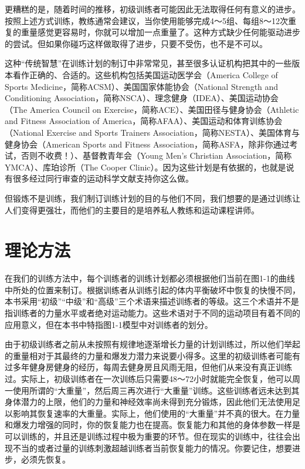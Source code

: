 更糟糕的是，随着时间的推移，初级训练者可能因此无法取得任何有意义的进步。按照上述方式训练，教练通常会建议，当你使用能够完成4～5组、每组8～12次重复的重量感觉更容易时，你就可以增加一点重量了。这种方式缺少任何能驱动进步的尝试。但如果你碰巧这样做取得了进步，只要不受伤，也不是不可以。

这种“传统智慧”在训练计划的制订中非常常见，甚至很多认证机构把其中的一些版本看作正确的、合适的。这些机构包括美国运动医学会（America College of Sports Medicine，简称ACSM）、美国国家体能协会（National Strength and Conditioning Association，简称NSCA）、理念健身（IDEA）、美国运动协会（The America Council on Exercise，简称ACE）、美国田径与健身协会（Athletic and Fitness Association of America，简称AFAA）、美国运动和体育训练协会（National Exercise and Sports Trainers Association，简称NESTA）、美国体育与健身协会（American Sports and Fitness Association，简称ASFA，除非你通过考试，否则不收费！）、基督教青年会（Young Men's Christian Association，简称YMCA）、库珀诊所（The Cooper Clinic）。因为这些计划是有依据的，也就是说有很多经过同行审查的运动科学文献支持你这么做。

但锻炼不是训练，我们制订训练计划的目的与他们不同，我们想要的是通过训练让人们变得更强壮，而他们的主要目的是培养私人教练和运动课程讲师。

\section{理论方法}

在我们的训练方法中，每个训练者的训练计划都必须根据他们当前在图1-1的曲线中所处的位置来制订。根据训练者从训练引起的体内平衡破坏中恢复的快慢不同，本书采用“初级”“中级”和“高级”三个术语来描述训练者的等级。这三个术语并不是指训练者的力量水平或者绝对运动能力。这些术语对于不同的运动项目有着不同的应用意义，但在本书中特指图1-1模型中对训练者的划分。

由于初级训练者之前从未按照有规律地逐渐增长力量的计划训练过，所以他们举起的重量相对于其最终的力量和爆发力潜力来说要小得多。这里的初级训练者可能有过多年健身房健身的经历，每周去健身房且风雨无阻，但他们从来没有真正训练过。实际上，初级训练者在一次训练后只需要48～72小时就能完全恢复，他可以周一使用所谓的“大重量”，然后周三再次进行“大重量”训练。这些训练者远未达到其身体潜力的上限，他们的力量和神经效率尚未得到充分锻炼，因此他们无法使用足以影响其恢复速率的大重量。实际上，他们使用的“大重量”并不真的很大。在力量和爆发力增强的同时，你的恢复能力也在提高。恢复能力和其他的身体参数一样是可以训练的，并且还是训练过程中极为重要的环节。但在现实的训练中，往往会出现不当的或者过量的训练刺激超越训练者当前恢复能力的情况。你要记住，想要进步，必须先恢复。

